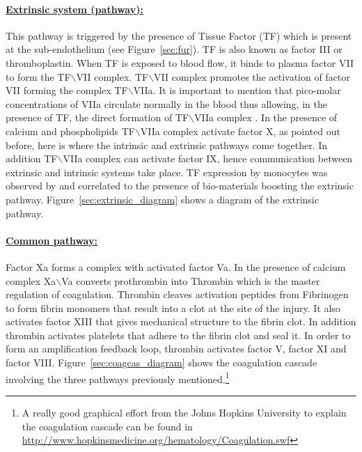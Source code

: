 \documentclass[%
 nofootinbib,
 amsmath,amssymb,
 aps,
 pra,
]{revtex4-1}
\begin{document}
\paragraph{\underline{Extrinsic system (pathway):}}
This pathway is triggered by the presence of %
Tissue Factor (TF) which is present at the sub-endothelium (see Figure~\ref{sec:fur}). TF is also known as factor III or thromboplastin. When TF is exposed to blood flow, it binds to plasma factor VII to form the TF$\backslash$VII complex. TF$\backslash$VII complex promotes the activation of factor VII forming the complex TF$\backslash$VIIa. It is important to mention that pico-molar concentrations of VIIa circulate normally in the blood thus allowing, in the presence of TF, the direct formation of TF$\backslash$VIIa complex \citep{Gorbet:2004}. In the presence of calcium and phospholipids TF$\backslash$VIIa complex activate factor X, as pointed out before, here is where the intrinsic and extrinsic pathways come together. In addition TF$\backslash$VIIa complex can activate factor IX, hence communication between extrinsic and intrinsic systems take place. TF expression by monocytes was observed by \citet{Wilhelm:1998} and correlated to the presence of bio-materials boosting the extrinsic pathway. Figure~\ref{sec:extrinsic_diagram} shows a diagram of the extrinsic pathway.\\

\paragraph{\underline{Common pathway:}}
Factor Xa forms a complex with activated factor Va. In the presence of calcium complex Xa$\backslash$Va converts prothrombin into Thrombin which is the master regulation of coagulation. Thrombin cleaves activation peptides from Fibrinogen to form fibrin monomers that result into a clot at the site of the injury. It also activates factor XIII that gives mechanical structure to the fibrin clot. In addition thrombin activates platelets that adhere to the fibrin clot and seal it. In order to form an amplification feedback loop, thrombin activates factor V, factor XI and factor VIII. Figure~\ref{sec:coagcas_diagram} shows the coagulation cascade involving the three pathways previously mentioned.\footnote{A really good graphical effort from the Johns Hopkins University to explain the coagulation cascade can be found in \url{http://www.hopkinsmedicine.org/hematology/Coagulation.swf}}\\
\end{document}
